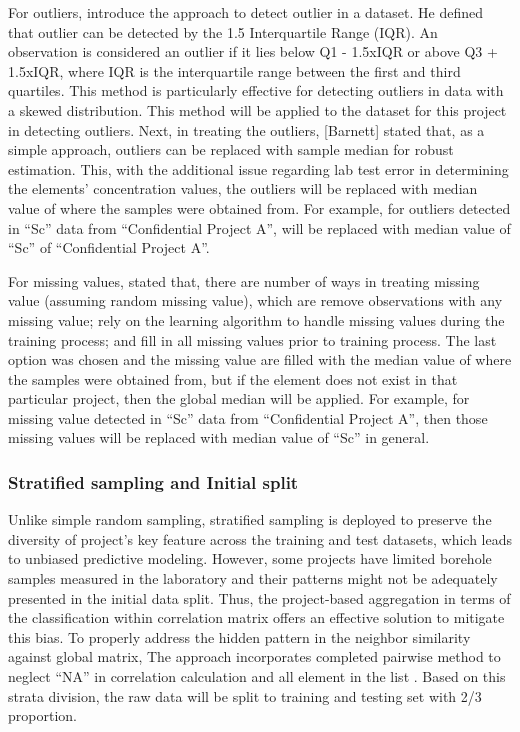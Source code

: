 \documentclass[11pt,a4paper,]{article}
\begin{document}
For outliers, \textcite{tukey1977} introduce the approach to detect outlier in a dataset. He defined that outlier can be detected by the 1.5 Interquartile Range (IQR). An observation is considered an outlier if it lies below Q1 - 1.5xIQR or above Q3 + 1.5xIQR, where IQR is the interquartile range between the first and third quartiles. This method is particularly effective for detecting outliers in data with a skewed distribution. This method will be applied to the dataset for this project in detecting outliers. Next, in treating the outliers, {[}Barnett{]} stated that, as a simple approach, outliers can be replaced with sample median for robust estimation. This, with the additional issue regarding lab test error in determining the elements' concentration values, the outliers will be replaced with median value of where the samples were obtained from. For example, for outliers detected in ``Sc'' data from ``Confidential Project A'', will be replaced with median value of ``Sc'' of ``Confidential Project A''.

For missing values, \textcite{Hastie09} stated that, there are number of ways in treating missing value (assuming random missing value), which are remove observations with any missing value; rely on the learning algorithm to handle missing values during the training process; and fill in all missing values prior to training process. The last option was chosen and the missing value are filled with the median value of where the samples were obtained from, but if the element does not exist in that particular project, then the global median will be applied. For example, for missing value detected in ``Sc'' data from ``Confidential Project A'', then those missing values will be replaced with median value of ``Sc'' in general.

\subsubsection{Stratified sampling and Initial split}\label{stratified-sampling-and-initial-split}

Unlike simple random sampling, stratified sampling is deployed to preserve the diversity of project's key feature across the training and test datasets, which leads to unbiased predictive modeling. However, some projects have limited borehole samples measured in the laboratory and their patterns might not be adequately presented in the initial data split. Thus, the project-based aggregation in terms of the classification within correlation matrix offers an effective solution to mitigate this bias. To properly address the hidden pattern in the neighbor similarity against global matrix, The approach incorporates completed pairwise method to neglect ``NA'' in correlation calculation and all element in the list \autocite{Menon2020}. Based on this strata division, the raw data will be split to training and testing set with 2/3 proportion.
\end{document}
